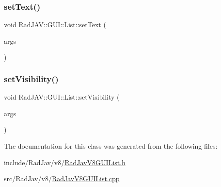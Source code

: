 \mbox{\label{class_rad_j_a_v_1_1_g_u_i_1_1_list_ac0216e4bee01f0b90fdee3628ce9cf17}} 
\subsubsection{\texorpdfstring{set\+Text()}{setText()}}
{\footnotesize\ttfamily void Rad\+J\+A\+V\+::\+G\+U\+I\+::\+List\+::set\+Text (\begin{DoxyParamCaption}\item[{const v8\+::\+Function\+Callback\+Info$<$ v8\+::\+Value $>$ \&}]{args }\end{DoxyParamCaption})\hspace{0.3cm}{\ttfamily [static]}}

\mbox{\label{class_rad_j_a_v_1_1_g_u_i_1_1_list_a73289ab4915bc72418f4d24b74f71935}} 
\subsubsection{\texorpdfstring{set\+Visibility()}{setVisibility()}}
{\footnotesize\ttfamily void Rad\+J\+A\+V\+::\+G\+U\+I\+::\+List\+::set\+Visibility (\begin{DoxyParamCaption}\item[{const v8\+::\+Function\+Callback\+Info$<$ v8\+::\+Value $>$ \&}]{args }\end{DoxyParamCaption})\hspace{0.3cm}{\ttfamily [static]}}



The documentation for this class was generated from the following files\+:\begin{DoxyCompactItemize}
\item 
include/\+Rad\+Jav/v8/\mbox{\hyperlink{_rad_jav_v8_g_u_i_list_8h}{Rad\+Jav\+V8\+G\+U\+I\+List.\+h}}\item 
src/\+Rad\+Jav/v8/\mbox{\hyperlink{_rad_jav_v8_g_u_i_list_8cpp}{Rad\+Jav\+V8\+G\+U\+I\+List.\+cpp}}\end{DoxyCompactItemize}
